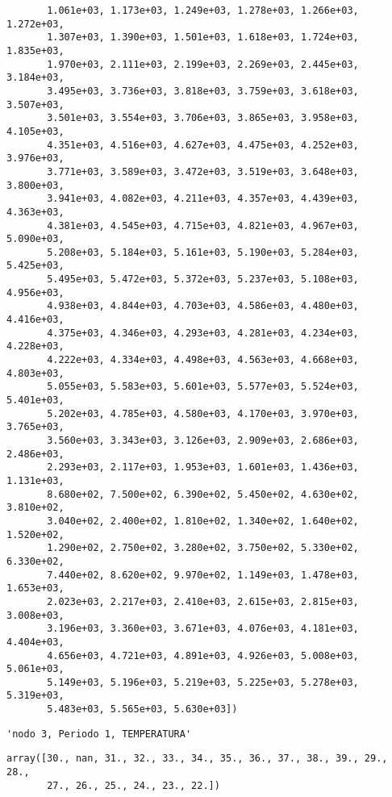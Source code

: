 \documentclass[11pt]{article}
\begin{document}
\begin{verbatim}
       1.061e+03, 1.173e+03, 1.249e+03, 1.278e+03, 1.266e+03, 1.272e+03,
       1.307e+03, 1.390e+03, 1.501e+03, 1.618e+03, 1.724e+03, 1.835e+03,
       1.970e+03, 2.111e+03, 2.199e+03, 2.269e+03, 2.445e+03, 3.184e+03,
       3.495e+03, 3.736e+03, 3.818e+03, 3.759e+03, 3.618e+03, 3.507e+03,
       3.501e+03, 3.554e+03, 3.706e+03, 3.865e+03, 3.958e+03, 4.105e+03,
       4.351e+03, 4.516e+03, 4.627e+03, 4.475e+03, 4.252e+03, 3.976e+03,
       3.771e+03, 3.589e+03, 3.472e+03, 3.519e+03, 3.648e+03, 3.800e+03,
       3.941e+03, 4.082e+03, 4.211e+03, 4.357e+03, 4.439e+03, 4.363e+03,
       4.381e+03, 4.545e+03, 4.715e+03, 4.821e+03, 4.967e+03, 5.090e+03,
       5.208e+03, 5.184e+03, 5.161e+03, 5.190e+03, 5.284e+03, 5.425e+03,
       5.495e+03, 5.472e+03, 5.372e+03, 5.237e+03, 5.108e+03, 4.956e+03,
       4.938e+03, 4.844e+03, 4.703e+03, 4.586e+03, 4.480e+03, 4.416e+03,
       4.375e+03, 4.346e+03, 4.293e+03, 4.281e+03, 4.234e+03, 4.228e+03,
       4.222e+03, 4.334e+03, 4.498e+03, 4.563e+03, 4.668e+03, 4.803e+03,
       5.055e+03, 5.583e+03, 5.601e+03, 5.577e+03, 5.524e+03, 5.401e+03,
       5.202e+03, 4.785e+03, 4.580e+03, 4.170e+03, 3.970e+03, 3.765e+03,
       3.560e+03, 3.343e+03, 3.126e+03, 2.909e+03, 2.686e+03, 2.486e+03,
       2.293e+03, 2.117e+03, 1.953e+03, 1.601e+03, 1.436e+03, 1.131e+03,
       8.680e+02, 7.500e+02, 6.390e+02, 5.450e+02, 4.630e+02, 3.810e+02,
       3.040e+02, 2.400e+02, 1.810e+02, 1.340e+02, 1.640e+02, 1.520e+02,
       1.290e+02, 2.750e+02, 3.280e+02, 3.750e+02, 5.330e+02, 6.330e+02,
       7.440e+02, 8.620e+02, 9.970e+02, 1.149e+03, 1.478e+03, 1.653e+03,
       2.023e+03, 2.217e+03, 2.410e+03, 2.615e+03, 2.815e+03, 3.008e+03,
       3.196e+03, 3.360e+03, 3.671e+03, 4.076e+03, 4.181e+03, 4.404e+03,
       4.656e+03, 4.721e+03, 4.891e+03, 4.926e+03, 5.008e+03, 5.061e+03,
       5.149e+03, 5.196e+03, 5.219e+03, 5.225e+03, 5.278e+03, 5.319e+03,
       5.483e+03, 5.565e+03, 5.630e+03])
    \end{verbatim}

    
    
    \begin{verbatim}
'nodo 3, Periodo 1, TEMPERATURA'
    \end{verbatim}

    
    
    \begin{verbatim}
array([30., nan, 31., 32., 33., 34., 35., 36., 37., 38., 39., 29., 28.,
       27., 26., 25., 24., 23., 22.])
    \end{verbatim}
\end{document}
